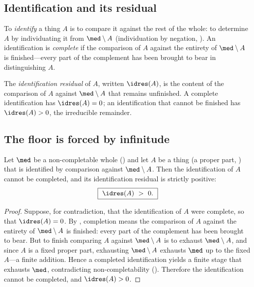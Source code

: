 \subsection{Identification and its residual}

\begin{definition}[Identification]
\label{def:identification}
To \emph{identify} a thing $A$ is to compare it against the rest of the whole:
to determine $A$ by individuating it from $\med\setminus A$
\textup{(}individuation by negation, \textup{)}. An
identification is \emph{complete} if the comparison of $A$ against the entirety of
$\med\setminus A$ is finished---every part of the complement has been brought to
bear in distinguishing $A$.
\end{definition}

\begin{definition}
\label{def:idresidual}
The \emph{identification residual} of $A$, written $\idres(A)$, is the content of
the comparison of $A$ against $\med\setminus A$ that remains unfinished. A
complete identification has $\idres(A)=0$; an identification that cannot be
finished has $\idres(A)>0$, the irreducible remainder.
\end{definition}

\subsection{The floor is forced by infinitude}

\begin{theorem}
\label{thm:floor-infinitude}
Let $\med$ be a non-completable whole \textup{(}\textup{)}
and let $A$ be a thing \textup{(}a proper part, \textup{)} that is
identified by comparison against $\med\setminus A$. Then the identification of $A$
cannot be completed, and its identification residual is strictly positive:
\[
\boxed{\ \idres(A)\ >\ 0.\ }
\]
\end{theorem}

\begin{proof}
Suppose, for contradiction, that the identification of $A$ were complete, so that
$\idres(A)=0$. By , completion means the comparison of
$A$ against the entirety of $\med\setminus A$ is finished: every part of the
complement has been brought to bear. But to finish comparing $A$ against
$\med\setminus A$ is to exhaust $\med\setminus A$, and since $A$ is a fixed proper
part, exhausting $\med\setminus A$ exhausts $\med$ up to the fixed $A$---a finite
addition. Hence a completed identification yields a finite stage that exhausts
$\med$, contradicting non-completability \textup{(}\textup{)}.
Therefore the identification cannot be completed, and $\idres(A)>0$.
\end{proof}

